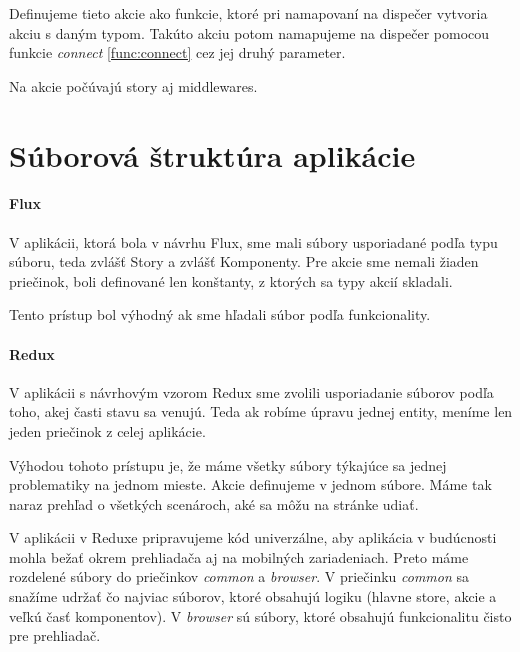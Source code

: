 Definujeme tieto akcie ako funkcie, ktoré pri namapovaní na dispečer vytvoria akciu s daným typom. Takúto akciu potom namapujeme na dispečer pomocou funkcie \emph{connect} \ref{func:connect} cez jej druhý parameter.

Na akcie počúvajú story aj middlewares.



\section{Súborová štruktúra aplikácie}
\paragraph{Flux}
V aplikácii, ktorá bola v návrhu Flux, sme mali súbory usporiadané podľa typu súboru, teda zvlášť Story a zvlášť Komponenty. Pre akcie sme nemali žiaden priečinok, boli definované len konštanty, z ktorých sa typy akcií skladali.

Tento prístup bol výhodný ak sme hľadali súbor podľa funkcionality.

\paragraph{Redux}
V aplikácii s návrhovým vzorom Redux sme zvolili usporiadanie súborov podľa toho, akej časti stavu sa venujú. Teda ak robíme úpravu jednej entity, meníme len jeden priečinok z celej aplikácie.

Výhodou tohoto prístupu je, že máme všetky súbory týkajúce sa jednej problematiky na jednom mieste.
Akcie definujeme v jednom súbore. Máme tak naraz prehľad o všetkých scenároch, aké sa môžu na stránke udiať.

V aplikácii v Reduxe pripravujeme kód univerzálne, aby aplikácia v budúcnosti mohla bežať okrem prehliadača aj na mobilných zariadeniach. Preto máme rozdelené súbory do priečinkov \emph{common} a \emph{browser}. V priečinku \emph{common} sa snažíme udržať čo najviac súborov, ktoré obsahujú logiku (hlavne store, akcie a veľkú časť komponentov). V \emph{browser} sú súbory, ktoré obsahujú funkcionalitu čisto pre prehliadač.
